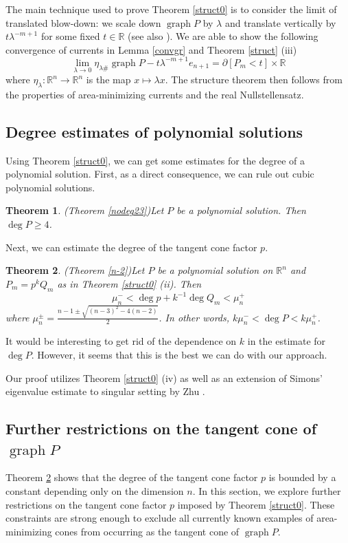 \documentclass[pdflatex,sn-mathphys-num]{sn-jnl}%
\theoremstyle{thmstyleone}%
\newtheorem{theorem}{Theorem}[section]%
\theoremstyle{thmstyletwo}%
\theoremstyle{thmstylethree}%
\newcommand{\R}{\mathbb{R}}
\DeclareMathOperator{\graph}{graph}
\begin{document}
The main technique used to prove Theorem \ref{struct0} is to consider the limit of translated blow-down: we scale down $\graph P$ by $\lambda$ and translate vertically by $t\lambda^{-m+1}$ for some fixed $t\in\R$ (see also \cite[Proof of Theorem 4]{simon1989entire}). We are able to show the following convergence of currents in Lemma \ref{convgr} and Theorem \ref{struct} (iii) \[\lim_{\lambda\to 0}\eta_{\lambda\#}\graph P-t\lambda^{-m+1}e_{n+1}= \partial[P_m<t]\times\R\]
where $\eta_\lambda:\R^n\to \R^n$ is the map $x\mapsto \lambda x$.
The structure theorem then follows from the properties of area-minimizing currents and the real Nullstellensatz.


\subsection{Degree estimates of polynomial solutions}

Using Theorem \ref{struct0}, we can get some estimates for the degree of a polynomial solution. First, as a direct consequence, we can rule out cubic polynomial solutions.
\begin{theorem}(Theorem \ref{nodeg23})\label{nodeg30}
	Let $P$ be a polynomial solution. Then $\deg P\ge 4$.
\end{theorem}


Next, we can estimate the degree of the tangent cone factor $p$.

\begin{theorem}(Theorem \ref{n-2})\label{n-20}
	Let $P$ be a polynomial solution  on $\R^n$ and $P_m=p^kQ_m$ as in Theorem \ref{struct0} (ii). Then 
	\[\mu_n^-< \deg p +k^{-1}\deg Q_m< \mu_n^+\] where
	$\mu_n^{\pm}= \frac{n-1\pm\sqrt{(n-3)^2-4(n-2)}}{2}$. In other words, $k\mu_n^-<\deg P< k\mu_n^+$.
\end{theorem}
It would be interesting to get rid of the dependence on $k$ in the estimate for $\deg P$. However, it seems that this is the best we can do with our approach.

Our proof utilizes Theorem \ref{struct0} (iv) as well as an extension of Simons' eigenvalue estimate to singular setting by Zhu \cite{zhu2018first}.

\subsection{Further restrictions on the tangent cone of \texorpdfstring{$\graph P$}{graph P}}
Theorem \ref{n-20} shows that the degree of the tangent cone factor $p$ is bounded by a constant depending only on the dimension $n$. In this section, we explore further restrictions on the tangent cone factor $p$ imposed by Theorem \ref{struct0}. These constraints are strong enough to exclude all currently known examples of area-minimizing cones from occurring as the tangent cone of $\graph P$.
\end{document}
